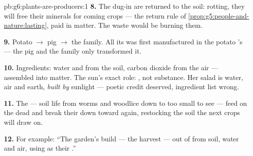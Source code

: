 \begin{solution}{pb:g6:plants-are-producers:1}
\textbf{8.} The dug-in  are  returned to
the soil: rotting, they will free their minerals for coming
crops --- the return rule of
\cref{prop:g5:people-and-nature:lasting}, paid in 
matter. The waste would be burning them.

\textbf{9.} Potato  $\rightarrow$ pig $\rightarrow$ the
family. All its  was first manufactured in the
potato 's  --- the pig and the family only
transformed it.

\textbf{10.} Ingredients: water and  from the
soil, carbon dioxide from the air --- assembled into 
matter. The sun's exact role: , not substance. Her
salad is water, air and earth, \emph{built by} sunlight ---
poetic credit deserved, ingredient list wrong.

\textbf{11.} The  --- soil life from worms and
woodlice down to  too small to see --- feed on
the dead  and break their  down toward
 again, restocking the soil the next crops
will draw on.

\textbf{12.} For example: ``The garden's  build
 --- the harvest --- out of 
from soil, water and air, using  as their .''
\end{solution}
